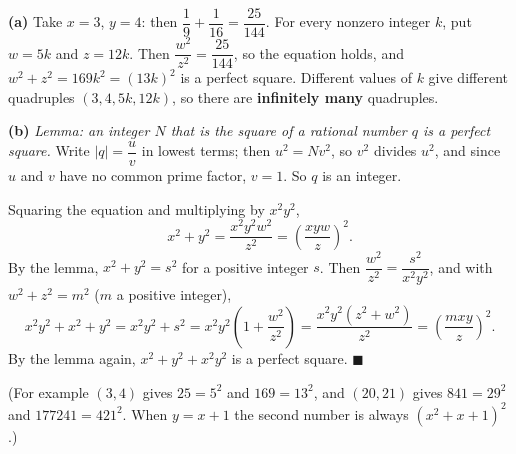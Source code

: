 \textbf{(a)} Take $x=3$, $y=4$: then $\dfrac19+\dfrac1{16}=\dfrac{25}{144}$. For every nonzero integer $k$, put $w=5k$ and $z=12k$. Then $\dfrac{w^2}{z^2}=\dfrac{25}{144}$, so the equation holds, and $w^2+z^2=169k^2=(13k)^2$ is a perfect square. Different values of $k$ give different quadruples $(3,4,5k,12k)$, so there are \textbf{infinitely many} quadruples.

\textbf{(b)} \emph{Lemma: an integer $N$ that is the square of a rational number $q$ is a perfect square.} Write $|q|=\dfrac uv$ in lowest terms; then $u^2=Nv^2$, so $v^2$ divides $u^2$, and since $u$ and $v$ have no common prime factor, $v=1$. So $q$ is an integer.

Squaring the equation and multiplying by $x^2y^2$,
\[x^2+y^2=\dfrac{x^2y^2w^2}{z^2}=\left(\dfrac{xyw}{z}\right)^2.\]
By the lemma, $x^2+y^2=s^2$ for a positive integer $s$. Then $\dfrac{w^2}{z^2}=\dfrac{s^2}{x^2y^2}$, and with $w^2+z^2=m^2$ ($m$ a positive integer),
\[x^2y^2+x^2+y^2=x^2y^2+s^2=x^2y^2\left(1+\dfrac{w^2}{z^2}\right)=\dfrac{x^2y^2\left(z^2+w^2\right)}{z^2}=\left(\dfrac{mxy}{z}\right)^2.\]
By the lemma again, $x^2+y^2+x^2y^2$ is a perfect square. $\blacksquare$

(For example $(3,4)$ gives $25=5^2$ and $169=13^2$, and $(20,21)$ gives $841=29^2$ and $177241=421^2$. When $y=x+1$ the second number is always $\left(x^2+x+1\right)^2$.)
